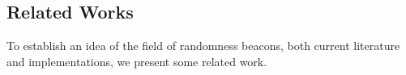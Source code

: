 \subsection{Related Works}%
\label{sub:related_works}
To establish an idea of the field of randomness beacons, both current literature and implementations, we present some related work.


